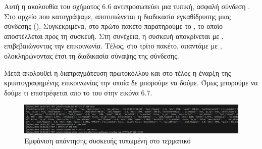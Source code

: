 \FloatBarrier

Αυτή η ακολουθία του σχήματος 6.6 αντιπροσωπεύει μια τυπική, ασφαλή σύνδεση . Στο αρχείο  που καταγράψαμε, αποτυπώνεται η διαδικασία εγκαθίδρυσης μιας σύνδεσης  (). Συγκεκριμένα, στο πρώτο πακέτο παρατηρούμε το , το οποίο αποστέλλεται   προς τη συσκευή. Στη συνέχεια, η συσκευή αποκρίνεται με , επιβεβαιώνοντας την επικοινωνία. Τέλος, στο τρίτο πακέτο, απαντάμε με , ολοκληρώνοντας έτσι τη διαδικασία σύναψης της σύνδεσης.

Μετά ακολουθεί η διαπραγμάτευση πρωτοκόλλου  και στο τέλος η έναρξη της κρυπτογραφημένης επικοινωνίας την οποία δε μπορούμε να δούμε. Όμως μπορούμε να δούμε τι επιστρέφεται 
απο το  του  στην  εικόνα 6.7.

\FloatBarrier
\begin{figure}[htb]
	\centering
	\includegraphics[width=1\textwidth]{graphics/rest.png}
	\caption{Εμφάνιση απάντησης συσκευής τυπωμένη στο τερματικό}
\end{figure}

\FloatBarrier







